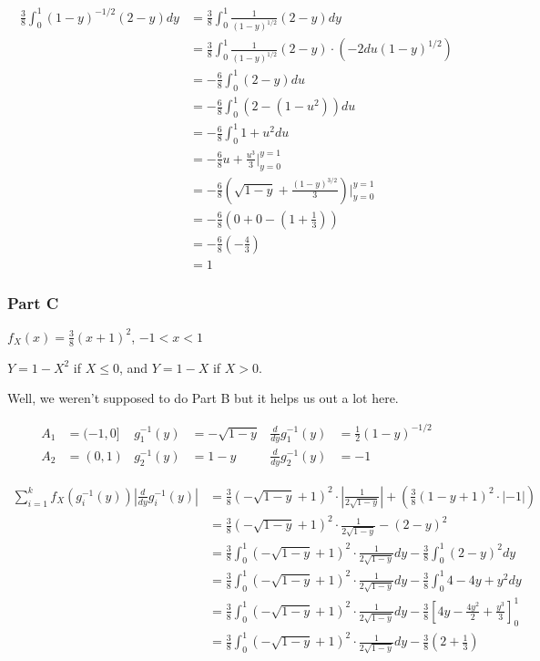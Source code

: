 \begin{align*}
	\frac{3}{8} \int_0^1 (1-y)^{-1/2} (2-y) dy &= \frac{3}{8} \int_0^1 \frac{1}{(1-y)^{1/2}} (2-y) dy \\
	&= \frac{3}{8} \int_0^1 \frac{1}{(1-y)^{1/2}} (2-y) \cdot (-2du(1-y)^{1/2}) \\
	&= -\frac{6}{8} \int_0^1 (2-y) du \\
	&= -\frac{6}{8} \int_0^1 (2-(1 - u^2)) du \\
	&= -\frac{6}{8} \int_0^1 1 + u^2 du \\
	&= -\frac{6}{8} u + \frac{u^3}{3} \bigg\rvert_{y=0}^{y=1} \\
	&= -\frac{6}{8} \left( \sqrt{1-y} + \frac{(1-y)^{3/2}}{3} \right)\bigg\rvert_{y=0}^{y=1} \\
	&= -\frac{6}{8} \left(0 + 0 - \left(1 + \frac{1}{3}\right)\right) \\
	&= -\frac{6}{8} \left(- \frac{4}{3}\right) \\
	&= 1
\end{align*}

\subsubsection*{Part C}

$f_X(x) = \frac{3}{8}(x+1)^2$, $-1 < x < 1$

\noindent $Y = 1 - X^2$ if $X \leq 0$, and $Y = 1 - X$ if $X > 0$.

Well, we weren't supposed to do Part B but it helps us out a lot here. 

\begin{align*}
	A_1 &= (-1, 0] & g_1^{-1}(y) &= -\sqrt{1-y} & \frac{d}{dy}g_1^{-1}(y) &= \frac{1}{2}(1-y)^{-1/2}\\
	A_2 &= (0, 1)  & g_2^{-1}(y) &= 1-y & \frac{d}{dy}g_2^{-1}(y) &= -1
\end{align*}

\begin{align*}
	\sum_{i=1}^k f_X(g_i^{-1}(y)) \left| \frac{d}{dy}g_i^{-1}(y) \right| 
	&= \frac{3}{8} (-\sqrt{1-y} + 1)^2 \cdot \left| \frac{1}{2\sqrt{1-y}} \right| + \left( \frac{3}{8} (1 - y + 1)^2 \cdot |-1| \right) \\
	&=  \frac{3}{8} (-\sqrt{1-y} + 1)^2 \cdot \frac{1}{2 \sqrt{1-y}} - (2-y)^2 \\
	&= \frac{3}{8} \int_0^1 (-\sqrt{1-y} + 1)^2 \cdot \frac{1}{2 \sqrt{1-y}} dy - \frac{3}{8} \int_0^1  (2-y)^2 dy \\
	&= \frac{3}{8} \int_0^1 (-\sqrt{1-y} + 1)^2 \cdot \frac{1}{2 \sqrt{1-y}} dy - \frac{3}{8} \int_0^1 4 - 4y + y^2 dy \\
	&= \frac{3}{8} \int_0^1 (-\sqrt{1-y} + 1)^2 \cdot \frac{1}{2 \sqrt{1-y}} dy - \frac{3}{8} \left[ 4y - \frac{4y^2}{2} + \frac{y^3}{3} \right]_0^1 \\
	&= \frac{3}{8} \int_0^1 (-\sqrt{1-y} + 1)^2 \cdot \frac{1}{2 \sqrt{1-y}} dy - \frac{3}{8} \left( 2 + \frac{1}{3} \right) 
\end{align*}


